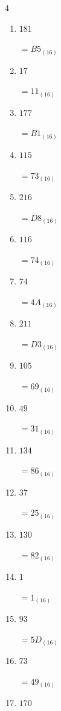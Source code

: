 \begin{multicols}{4}
\begin{enumerate}
  \item $181$

        $=B5_{(16)}$

  \item $17$

        $=11_{(16)}$

  \item $177$

        $=B1_{(16)}$

  \item $115$

        $=73_{(16)}$

  \item $216$

        $=D8_{(16)}$

  \item $116$

        $=74_{(16)}$

  \item $74$

        $=4A_{(16)}$

  \item $211$

        $=D3_{(16)}$

  \item $105$

        $=69_{(16)}$

  \item $49$

        $=31_{(16)}$

  \item $134$

        $=86_{(16)}$

\columnbreak %

  \item $37$

        $=25_{(16)}$

  \item $130$

        $=82_{(16)}$

  \item $1$

        $=1_{(16)}$

  \item $93$

        $=5D_{(16)}$

  \item $73$

        $=49_{(16)}$

  \item $170$


\end{enumerate}
\end{multicols}
